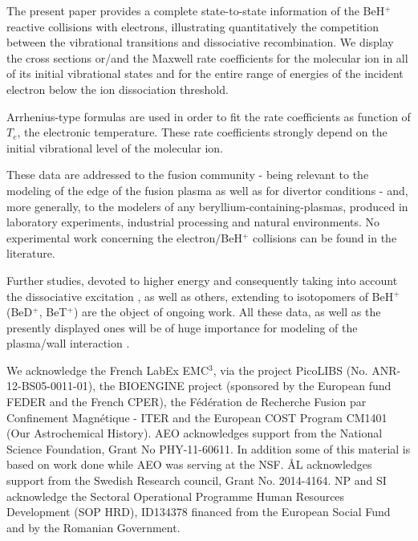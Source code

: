 \documentclass[reviewcopy]{elsarticle}
\begin{document}
The present paper  provides a complete state-to-state information of the BeH$^{+}$ reactive collisions with electrons, illustrating quantitatively the competition between the
vibrational transitions and dissociative recombination. We display the cross
sections or/and the Maxwell rate coefficients for the molecular ion in
all of its initial vibrational states and for the entire range of energies of the incident electron below the ion dissociation threshold.

Arrhenius-type formulas are used in order to fit the rate coefficients as function
of $T_{e}$, the electronic temperature. These rate coefficients strongly depend on 
the initial vibrational level of the molecular ion.

These data are addressed to the fusion community - being relevant to the modeling
of the edge of the fusion plasma as well as for divertor conditions - and, more generally, to the modelers of any beryllium-containing-plasmas, produced in laboratory experiments, industrial processing and natural environments. No experimental work concerning the electron$/$BeH$^+$ collisions can be found in the literature.

Further studies, devoted to higher energy and consequently taking into account the 
dissociative excitation \cite{Kalyan2013}, as well as others, extending to isotopomers of BeH$^+$ (BeD$^+$, BeT$^+$) are the object of ongoing work. All these data, as well as the presently displayed ones will be of huge importance for modeling of the  plasma/wall interaction \cite{Reiter2012}.

\ack
We acknowledge the French LabEx EMC$^3$, via the project PicoLIBS (No. ANR-12-BS05-0011-01), the BIOENGINE project (sponsored by the European fund FEDER and the French CPER), the Fédération de Recherche Fusion par Confinement Magnétique - ITER and the European COST Program CM1401 (Our Astrochemical History). AEO acknowledges support from the National Science Foundation, Grant No PHY-11-60611. In addition some of this material is based on work done while AEO was serving at the NSF. {\AA}L acknowledges support from the Swedish Research council, Grant No. 2014-4164. 
NP and SI acknowledge the Sectoral Operational Programme Human Resources Development (SOP HRD), ID134378 financed from the European Social Fund and by the Romanian Government. 
\end{document}
